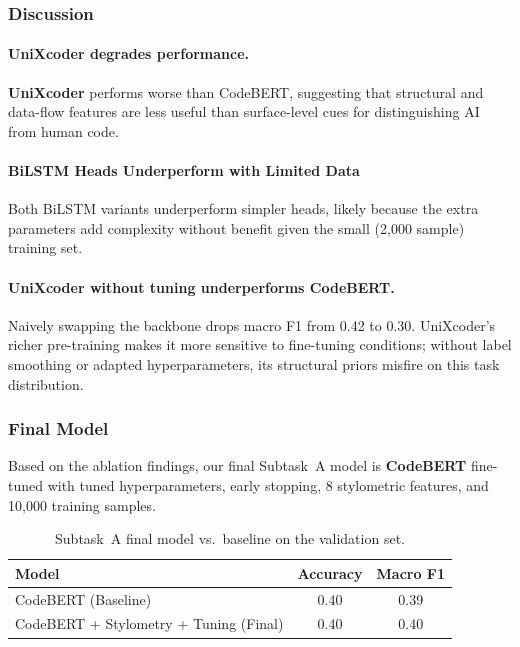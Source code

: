 \documentclass[11pt]{article}
\begin{document}
\subsubsection{Discussion}
% 

\paragraph{UniXcoder degrades performance.}
\textbf{UniXcoder} performs worse than CodeBERT, suggesting that structural and data-flow features are less useful than surface-level cues for distinguishing AI from human code.

\paragraph{BiLSTM Heads Underperform with Limited Data}
Both BiLSTM variants underperform simpler heads, likely because the extra parameters add complexity without benefit given the small (2,000 sample) training set.

\paragraph{UniXcoder without tuning underperforms CodeBERT.}
Naively swapping the backbone drops macro F1 from 0.42 to 0.30. UniXcoder's richer pre-training makes it more sensitive to fine-tuning conditions; without label smoothing or adapted hyperparameters, its structural priors misfire on this task distribution.

\subsubsection{Final Model}

Based on the ablation findings, our final Subtask~A model is \textbf{CodeBERT} fine-tuned with tuned hyperparameters, early stopping, 8 stylometric features, and 10,000 training samples.

\begin{table}[htbp]
\centering
\small
\begin{tabularx}{\columnwidth}{@{}X c c@{}}
\toprule
\textbf{Model} & \textbf{Accuracy} & \textbf{Macro F1} \\
\midrule
CodeBERT (Baseline) & 0.40 & 0.39 \\
CodeBERT + Stylometry + Tuning (Final) & 0.40 & 0.40 \\
\bottomrule
\end{tabularx}
\caption{Subtask~A final model vs.\ baseline on the validation set.}
\label{tab:taskA_final}
\end{table}
\end{document}
